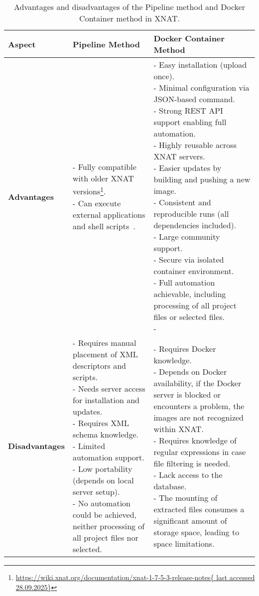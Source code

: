 \begin{table}[htbp]
\centering
\renewcommand{\arraystretch}{1.3}
\begin{tabular}{|p{3cm}|p{6cm}|p{6cm}|}
\hline
\textbf{Aspect} & \textbf{Pipeline Method} & \textbf{Docker Container Method} \\
\hline
\textbf{Advantages} &
\parbox[t]{6cm}{
- Fully compatible with older XNAT versions\footnote{\url{https://wiki.xnat.org/documentation/xnat-1-7-5-3-release-notes{ last accessed 28.09.2025}}}.\\
- Can execute external applications and shell scripts~\cite{jansen_extending_2015}.
}
&
\parbox[t]{6cm}{
- Easy installation (upload once). \\
- Minimal configuration via JSON-based command. \\
- Strong REST API support enabling full automation. \\
- Highly reusable across XNAT servers. \\
- Easier updates by building and pushing a new image. \\
- Consistent and reproducible runs (all dependencies included). \\
- Large community support. \\
- Secure via isolated container environment. \\
- Full automation achievable, including processing of all
project files or selected files.\\
- 
} \\
\hline
\textbf{Disadvantages} &
\parbox[t]{6cm}{
- Requires manual placement of XML descriptors and scripts. \\
- Needs server access for installation and updates. \\
- Requires XML schema knowledge. \\
- Limited automation support. \\
- Low portability (depends on local server setup).\\
- No automation could be achieved, neither processing of all project files nor selected.\\
}
&
\parbox[t]{6cm}{
- Requires Docker knowledge. \\
- Depends on Docker availability, if the Docker server is blocked or encounters a problem, the images are not recognized within XNAT. \\
- Requires knowledge of regular expressions in case file filtering is needed.\\
- Lack access to the database. \\
- The mounting of extracted files consumes a significant amount of storage space, leading to space limitations.\\
} \\
\hline
\end{tabular}
\caption{Advantages and disadvantages of the Pipeline method and Docker Container method in XNAT.}
\label{tab:docker_pipeline}
\end{table}












